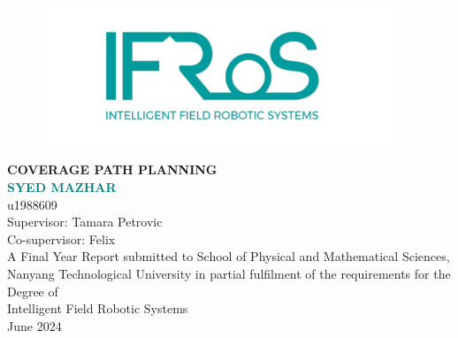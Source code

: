 \begin{titlepage}
\begin{figure}[!t]
\centering
\includegraphics[width = 4.2in]{Title/ifros.png}
\caption*{}
\end{figure}

\centering
\LARGE{\textbf{COVERAGE PATH PLANNING}}\\[1in]

\LARGE{\textcolor{teal}{\textbf{SYED MAZHAR}}}\\
\normalsize{u1988609}\\[0.2in]

\large{Supervisor: Tamara Petrovic}\\
\large{Co-supervisor: Felix}\\[0.5in]

\large{A Final Year Report submitted to School of Physical and Mathematical Sciences, Nanyang Technological University in partial fulfilment of the requirements for the Degree of }\\[1in]

\Large{Intelligent Field Robotic Systems}\\[1in]



\Large{June 2024}
\newpage
\end{titlepage}